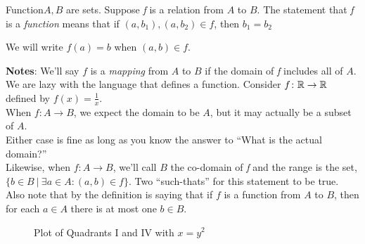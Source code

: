     \vspace{0.5cm}

            \begin{definition}
                {Function}\(A,B\) are sets. Suppose \textit{f} is a relation from \(A\) to \(B\). The statement that \textit{f} is a \textit{function} means that if \((a,b_1),(a,b_2) \in f\), then \(b_1 = b_2\)

                We will write \(f(a) = b\) when \((a,b)\in f\).

            \end{definition}
    
            \textbf{Notes}: We'll say \(f\) is a \textit{mapping} from \(A\) to \(B\) if the domain of \textit{f} includes all of \(A\). \\
            \indent We are lazy with the language that defines a function. Consider \(f\colon \mathbb{R} \rightarrow \mathbb{R}\) defined by \(f(x) = \frac{1}{x}\). \\
            \indent When \(f\colon A \rightarrow B\), we expect the domain to be \(A\), but it may actually be a subset of \(A\). \\
            \indent Either case is fine as long as you know the answer to ``What is the actual domain?'' \\
            \indent Likewise, when \(f\colon A \rightarrow B\), we'll call \(B\) the co-domain of \textit{f} and the range is the set, \(\{b\in B \ | \ \exists a \in A \colon (a,b) \in f\}\). Two ``such-thats'' for this statement to be true. \\
            \indent Also note that by the definition is saying that if \(f\) is a function from \(A\) to \(B\), then for each \(a\in A\) there is at most one  \(b\in B\).

            \vspace{0.5cm}

            \begin{figure}[h]
                \centering
                \caption{Plot of Quadrants I and IV with \(x = y^2\)}
            \end{figure}


